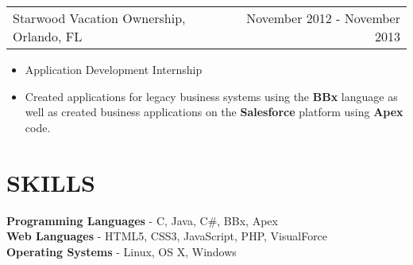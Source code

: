 \documentclass[margin]{res}
\begin{document}
\begin{resume}
			\begin{tabular}{p{3in} r}
				Starwood Vacation Ownership, Orlando, FL & November 2012 - November 2013
			\end{tabular}
			\begin{itemize}[noitemsep,nolistsep,leftmargin=0.16cm]
				\item[] Application Development Internship
				\item[] Created applications for legacy business systems using the
						{\bf BBx} language as well as created business applications
						on the {\bf Salesforce} platform using {\bf Apex} code.
			\end{itemize}

\section{SKILLS}
			{\bf Programming Languages} - C, Java, C\#, BBx, Apex				\\
			{\bf Web Languages} - HTML5, CSS3, JavaScript, PHP, VisualForce	\\
			{\bf Operating Systems} - Linux, OS X, Windows


\end{resume}
\end{document}
